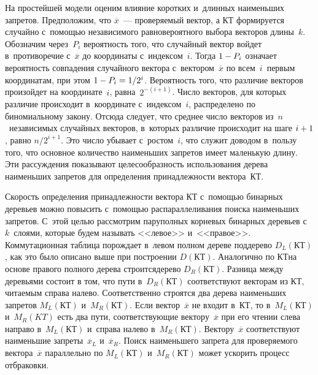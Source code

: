 \begin{multicols}{2}
  На простейшей модели оценим влияние коротких и~длинных наименьших 
запретов. Предположим, что $\overline{x}$~--- проверяемый вектор, а КТ 
формируется случайно с~помощью независимого равновероятно\-го выбора 
векторов длины~$k$. Обозначим через~$P_i$ вероятность того, что случайный 
вектор войдет в~противоречие с~$\overline{x}$ до координаты с~индексом~$i$. 
Тогда $1\hm- P_i$ означает вероятность совпадения случайного вектора 
с~вектором~$\overline{x}$ по всем~$i$~первым координатам, при этом $1\hm-
P_i \hm= 1/2^i$. Вероятность того, что различие векторов произойдет на 
координате~$i$, равна~$2^{-(i+1)}$. Чис\-ло векторов, для которых различие 
происходит в~координате с~индексом~$i$, распределено по биномиальному 
закону. Отсюда следует, что среднее чис\-ло векторов из~$n$~независимых 
случайных векторов, в~которых различие происходит на шаге $i\hm+1$, равно 
$n/2^{i+1}$. Это чис\-ло убывает с~ростом~$i$, что служит доводом в~пользу 
того, что основное количество наименьших запретов имеет маленькую длину. 
Эти рас\-суж\-де\-ния показывают целесообразность использования дерева 
наименьших запретов для определения принадлежности вектора~КТ. 
  
  Скорость определения принадлежности вектора КТ с~помощью бинарных 
деревьев можно повысить с~помощью распараллеливания поиска наименьших 
запретов. С~этой целью рассмотрим \mbox{пару}\linebreak полных корневых бинарных деревьев 
с~$k$~слоями, которые будем называть <<левое>> и~<<правое>>. Коммутационная таблица 
порождает в~левом полном дереве поддерево $D_L(\mathrm{КТ})$, как это было описано 
выше при по\-стро\-ении  $D(\mathrm{КТ})$. Аналогично по КТ\linebreak на основе правого 
полного дерева строится\linebreak дерево $D_R(\mathrm{КТ})$. Разница между деревьями состоит 
в том, что пути в~$D_R(\mathrm{КТ})$ соответствуют векторам из КТ, читаемым справа 
налево. Соответственно строятся два дерева наименьших запретов $M_L(\mathrm{КТ})$ 
и~$M_R(\mathrm{КТ})$. Если вектор~$\overline{x}$ не входит в~КТ, то в~$M_L(\mathrm{КТ})$ 
и~$M_R(KT)$ есть два пути, соответствующие вектору~$\overline{x}$ при его 
чтении слева направо в~$M_L(\mathrm{КТ})$ и~справа налево в~$M_R(\mathrm{КТ})$. 
Вектору~$\overline{x}$ соответствуют наименьшие запреты~$\overline{x}_L$ 
и~$\overline{x}_R$. Поиск наименьшего запрета для проверяемого 
вектора~$\overline{x}$ параллельно по $M_L(\mathrm{КТ})$ и~$M_R(\mathrm{КТ})$ может 
ускорить процесс отбраковки. 
  

\end{multicols}
